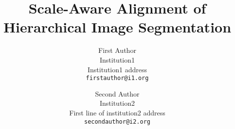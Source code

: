 \documentclass[10pt,twocolumn,letterpaper]{article}
\begin{document}
\title{Scale-Aware Alignment of Hierarchical Image Segmentation}

\author{First Author\\
Institution1\\
Institution1 address\\
{\tt\small firstauthor@i1.org}
\and
Second Author\\
Institution2\\
First line of institution2 address\\
{\tt\small secondauthor@i2.org}
}

\maketitle





%




{\small


}
\end{document}
